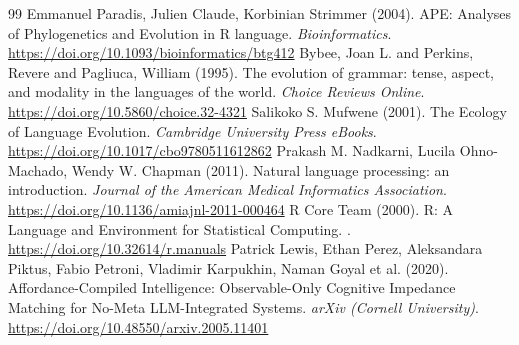 \documentclass[11pt,a4paper]{article}
\begin{document}
\begin{thebibliography}{99}
 Emmanuel Paradis, Julien Claude, Korbinian Strimmer (2004). APE: Analyses of Phylogenetics and Evolution in R language. \emph{Bioinformatics}. \url{https://doi.org/10.1093/bioinformatics/btg412}
 Bybee, Joan L. and Perkins, Revere and Pagliuca, William (1995). The evolution of grammar: tense, aspect, and modality in the languages of the world. \emph{Choice Reviews Online}. \url{https://doi.org/10.5860/choice.32-4321}
 Salikoko S. Mufwene (2001). The Ecology of Language Evolution. \emph{Cambridge University Press eBooks}. \url{https://doi.org/10.1017/cbo9780511612862}
 Prakash M. Nadkarni, Lucila Ohno-Machado, Wendy W. Chapman (2011). Natural language processing: an introduction. \emph{Journal of the American Medical Informatics Association}. \url{https://doi.org/10.1136/amiajnl-2011-000464}
 R Core Team (2000). R: A Language and Environment for Statistical Computing. \emph{}. \url{https://doi.org/10.32614/r.manuals}
 Patrick Lewis, Ethan Perez, Aleksandara Piktus, Fabio Petroni, Vladimir Karpukhin, Naman Goyal et al. (2020). Affordance-Compiled Intelligence: Observable-Only Cognitive Impedance Matching for No-Meta LLM-Integrated Systems. \emph{arXiv (Cornell University)}. \url{https://doi.org/10.48550/arxiv.2005.11401}
\end{thebibliography}
\end{document}

